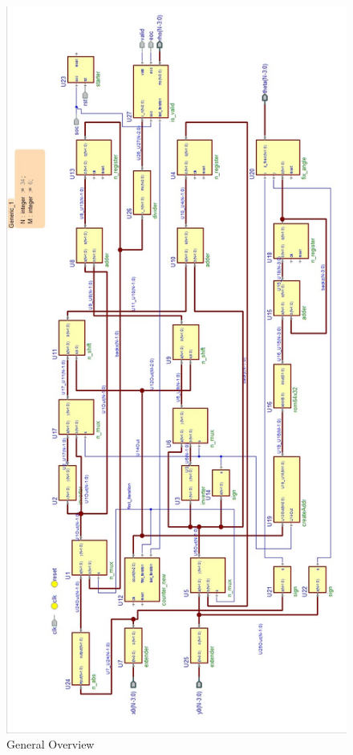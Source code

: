\documentclass[12pt,a4paper]{report}
\begin{document}
\pagebreak
\begin{figure}
\centering
\includegraphics[scale=0.52]{img/blockCordic.jpg}
\caption{General Overview\label{fig:block}}
\end{figure}
\end{document}
